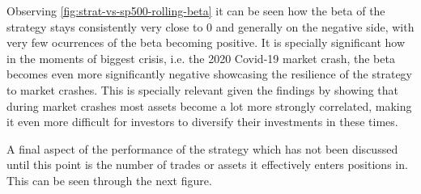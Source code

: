Observing \autoref{fig:strat-vs-sp500-rolling-beta} it can be seen how the beta of the strategy stays consistently very close to 0 and generally on the negative side, with very few ocurrences of the beta becoming positive. It is specially significant how in the moments of biggest crisis, i.e. the 2020 Covid-19 market crash, the beta becomes even more significantly negative showcasing the resilience of the strategy to market crashes. This is specially relevant given the findings by \cite{sandoval_franca_2012} showing that during market crashes most assets become a lot more strongly correlated, making it even more difficult for investors to diversify their investments in these times. 


A final aspect of the performance of the strategy which has not been discussed until this point is the number of trades or assets it effectively enters positions in. This can be seen through the next figure.

